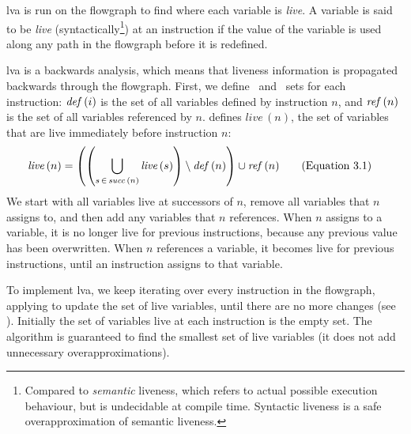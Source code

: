 \documentclass[00-main.tex]{subfiles}
\begin{document}
\Gls{lva} is run on the flowgraph to find where each variable is \emph{live}.
A variable is said to be \emph{live} (syntactically\footnote{Compared to \emph{semantic} liveness, which refers to actual possible execution behaviour, but is undecidable at compile time. Syntactic liveness is a safe overapproximation of semantic liveness.}) at an instruction if the value of the variable is used along any path in the flowgraph before it is redefined.

\Gls{lva} is a backwards analysis, which means that liveness information is propagated backwards through the flowgraph.
First, we define \lvadef\ and \lvaref\ sets for each instruction: $\mathit{def}\,(i)$ is the set of all variables defined by instruction $n$, and $\mathit{ref}\,(n)$ is the set of all variables referenced by $n$.
 defines $\mathit{live}\,(n)$, the set of variables that are live immediately before instruction $n$:
\begin{align}\label{eq:live vars}
  \mathit{live}\,(n) &= \left( \left( \bigcup_{s \,\in\, \mathit{succ}\,(n)} \mathit{live}\,(s) \right) \setminus \mathit{def}\,(n) \right) \cup \mathit{ref}\,(n)
  \tag{Equation~3.1}
\end{align}
We start with all variables live at successors of $n$, remove all variables that $n$ assigns to, and then add any variables that $n$ references.
When $n$ assigns to a variable, it is no longer live for previous instructions, because any previous value has been overwritten.
When $n$ references a variable, it becomes live for previous instructions, until an instruction assigns to that variable.

To implement \gls{lva}, we keep iterating over every instruction in the flowgraph, applying  to update the set of live variables, until there are no more changes (see ).
Initially the set of variables live at each instruction is the empty set.
The algorithm is guaranteed to find the smallest set of live variables (it does not add unnecessary overapproximations).
\end{document}
